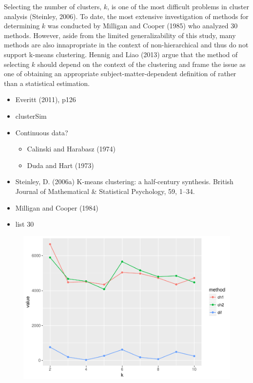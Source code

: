 \documentclass[floatsintext,man]{apa6}
\providecommand{\tightlist}{%
  \setlength{\itemsep}{0pt}\setlength{\parskip}{0pt}}
\theoremstyle{definition}
\theoremstyle{definition}
\theoremstyle{definition}
\theoremstyle{remark}
\begin{document}
Selecting the number of clusters, \(k\), is one of the most difficult
problems in cluster analysis (Steinley, 2006). To date, the most
extensive investigation of methods for determining \(k\) was conducted
by Milligan and Cooper (1985) who analyzed 30 methods. However, aside
from the limited generalizability of this study, many methods are also
innapropriate in the context of non-hierarchical and thus do not support
k-means clustering. Hennig and Liao (2013) argue that the method of
selecting \(k\) should depend on the context of the clustering and frame
the issue as one of obtaining an appropriate subject-matter-dependent
definition of rather than a statistical estimation.

\begin{itemize}
\item
  Everitt (2011), p126
\item
  clusterSim
\item
  Continuous data?

  \begin{itemize}
  \tightlist
  \item
    Calinski and Harabasz (1974)
  \item
    Duda and Hart (1973)
  \end{itemize}
\item
  Steinley, D. (2006a) K-means clustering: a half-century synthesis.
  British Journal of Mathematical \& Statistical Psychology, 59, 1--34.
\item
  Milligan and Cooper (1984)
\item
  list 30
\end{itemize}

\begin{figure}
\centering
\includegraphics{Method_files/figure-latex/SUBS_FULL_CH-1.pdf}
\caption{}
\end{figure}
\end{document}
